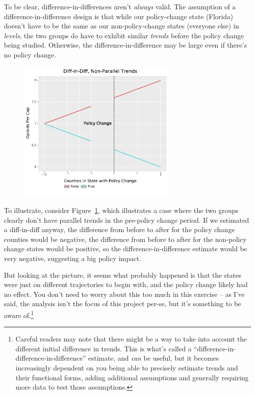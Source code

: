 \documentclass[12pt]{article}
\begin{document}
To be clear, difference-in-differences aren't \emph{always} valid. The assumption of a difference-in-difference design is that while our policy-change state (Florida) doesn't have to be the same as our non-policy-change states (everyone else) in \emph{levels}, the two groups do have to exhibit similar \emph{trends} before the policy change being studied. Otherwise, the difference-in-difference may be large even if there's no policy change.

\begin{figure}[h!]
  \centering
  \caption{}\label{figure_diffindiff_nonparallel}
  \includegraphics[width=0.7\textwidth]{images/diffindiff_non_parallel.pdf}
\end{figure}


To illustrate, consider Figure~\ref{figure_diffindiff_nonparallel}, which illustrates a case where the two groups clearly don't have parallel trends in the pre-policy change period. If we estimated a diff-in-diff anyway, the difference from before to after for the policy change counties would be negative, the difference from before to after for the non-policy change states would be positive, so the difference-in-difference estimate would be very negative, suggesting a big policy impact.

But looking at the picture, it seems what probably happened is that the states were just on different trajectories to begin with, and the policy change likely had no effect. You don't need to worry about this too much in this exercise -- as I've said, the analysis isn't the focus of this project per-se, but it's something to be aware of.\footnote{Careful readers may note that there might be a way to take into account the different initial difference in trends. This is what's called a ``difference-in-difference-in-difference'' estimate, and \emph{can} be useful, but it becomes increasingly dependent on you being able to precisely estimate trends and their functional forms, adding additional assumptions and generally requiring more data to test those assumptions.}
\end{document}
